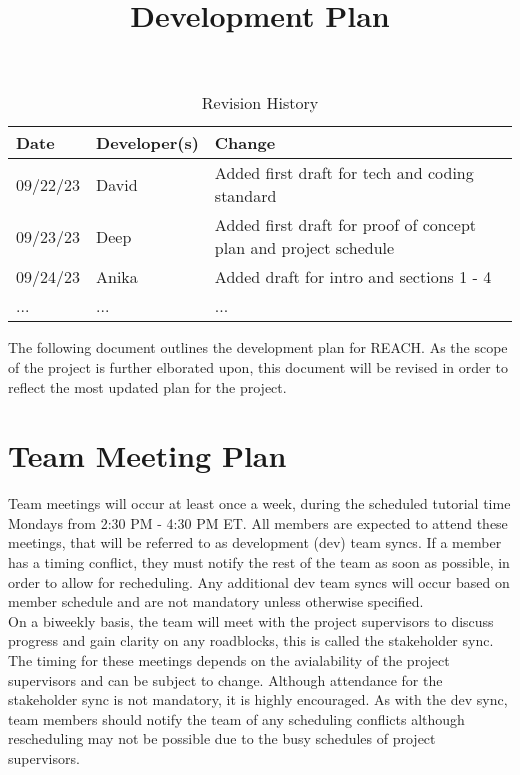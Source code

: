 \documentclass{article}
\title{Development Plan\\\progname}
\author{\authname}
\date{}
\begin{document}
\maketitle

\begin{table}[hp]
\caption{Revision History} \label{TblRevisionHistory}
\begin{tabularx}{\textwidth}{llX}
\toprule
\textbf{Date} & \textbf{Developer(s)} & \textbf{Change}\\
\midrule
09/22/23 & David & Added first draft for tech and coding standard\\
09/23/23 & Deep & Added first draft for proof of concept plan and project schedule\\
09/24/23 & Anika & Added draft for intro and sections 1 - 4 \\
... & ... & ...\\
\bottomrule
\end{tabularx}
\end{table}


\noindent The following document outlines the development plan for REACH.
As the scope of the project is further elborated upon, 
this document will be revised in order to reflect the most updated plan for the project.\\


\section{Team Meeting Plan} 
Team meetings will occur at least once a week, during the scheduled tutorial time Mondays from 2:30 PM - 4:30 PM ET.
All members are expected to attend these meetings, that will be referred to as development (dev) team syncs. 
If a member has a timing conflict, they must notify the rest of the team as soon as possible, in order to allow for recheduling.
Any additional dev team syncs will occur based on member schedule and are not mandatory unless otherwise specified.\\

On a biweekly basis, the team will meet with the project supervisors to discuss progress and gain clarity on any roadblocks, this is called the stakeholder sync. 
The timing for these meetings depends on the avialability of the project supervisors and can be subject to change. 
Although attendance for the stakeholder sync is not mandatory, it is highly encouraged. 
As with the dev sync, team members should notify the team of any scheduling conflicts although rescheduling may not be possible due to the busy schedules of project supervisors. \\
\end{document}
